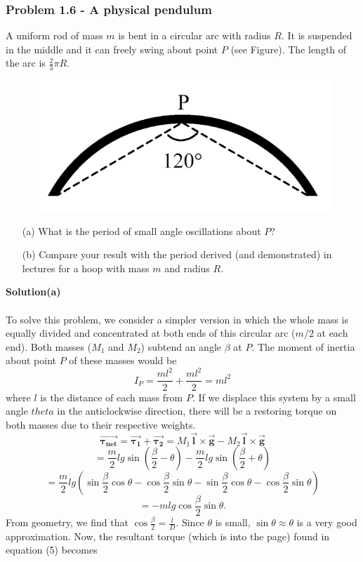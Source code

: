 \documentclass[12pt,a4paper]{article}
\begin{document}
\subsubsection*{Problem 1.6 - A physical pendulum}
A uniform rod of mass $m$ is bent in a circular arc with radius $R$. It is suspended in the middle and it can freely swing about point $P$ (see Figure). The length of the arc is $\frac{2}{3}\pi R$.
\begin{figure}[h]
    \centering
    \includegraphics[width=0.4\linewidth]{figs/fig_prob_1.6.png}
\end{figure}
\begin{enumerate}
    \item[(a)]What is the period of small angle oscillations about $P$?
    \item[(b)]Compare your result with the period derived (and demonstrated) in lectures for a hoop with mass $m$ and radius $R$.
\end{enumerate}
\textbf{Solution(a)}
\\
\\To solve this problem, we consider a simpler version in which the whole mass is equally divided and concentrated at both ends of this circular arc ($m/2$ at each end). Both masses ($M_1$ and $M_2$) subtend an angle $\beta$ at $P$. The moment of inertia about point $P$ of these masses would be
\[I_P=\frac{ml^2}{2}+\frac{ml^2}{2}=ml^2\]
where $l$ is the distance of each mass from $P$. If we displace this system by a small angle $theta$ in the anticlockwise direction, there will be a restoring torque on both masses due to their respective weights.
\[\boldsymbol{\Vec{\tau_{\text{net}}}}=\boldsymbol{\Vec{\tau_1}}+\boldsymbol{\Vec{\tau_2}}=M_1\boldsymbol{\Vec{l}}\times\boldsymbol{\Vec{g}}-M_2\boldsymbol{\Vec{l}}\times\boldsymbol{\Vec{g}}\]
\[=\frac{m}{2}lg\sin\left(\frac{\beta}{2}-\theta\right)-\frac{m}{2}lg\sin\left(\frac{\beta}{2}+\theta\right)\]
\[=\frac{m}{2}lg\left(\sin\frac{\beta}{2}\cos\theta-\cos\frac{\beta}{2}\sin\theta-\sin\frac{\beta}{2}\cos\theta-\cos\frac{\beta}{2}\sin\theta\right)\]
\begin{equation}
    =-mlg\cos\frac{\beta}{2}\sin\theta.
\end{equation}
From geometry, we find that $\cos\frac{\beta}{2}=\frac{l}{D}$. Since $\theta$ is small, $\sin\theta\approx\theta$ is a very good approximation. Now, the resultant torque (which is into the page) found in equation (5) becomes
\end{document}
